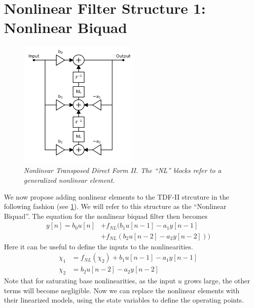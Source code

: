\documentclass[twoside,a4paper]{article}
\begin{document}
\section{Nonlinear Filter Structure 1: Nonlinear Biquad}
%
\begin{figure}[ht]
    \center
    \includegraphics[width=2.3in]{../Pics/NL-TDF-II-White.png}
    \caption{\label{NL-TDF-II}{\it Nonlinear Transposed Direct Form II.
                                The ``NL'' blocks refer to a generalized
                                nonlinear element.}}
\end{figure}
%
We now propose adding nonlinear elements to the TDF-II strcuture in the
following fashion (see \cref{NL-TDF-II}). We will refer to this structure
as the ``Nonlinear Biquad''.
%
The equation for the nonlinear biquad filter then becomes
%
\begin{equation}
\begin{split}
    y[n] = b_0 u[n]
         &+ f_{NL} (b_1 u[n-1] - a_1 y[n-1] \\
         &+ f_{NL} (b_2 u[n-2] - a_2 y[n-2]))
\end{split}
    \label{eq:bq_NL}
\end{equation}
%
Here it can be useful to define the inputs to the
nonlinearities.
%
\begin{equation}
\begin{split}
    \chi_1 &= f_{NL} (\chi_2) + b_1 u[n-1] - a_1 y[n-1] \\
    \chi_2 &= b_2 u[n-2] - a_2 y[n-2]
\end{split}
    \label{eq:states}
\end{equation}
%
Note that for saturating base nonlinearities, as the input $u$ grows large,
the other terms will become negligible.
\newline\newline
Now we can replace the nonlinear elements with their linearized
models, using the state variables to define the operating points.
\end{document}

